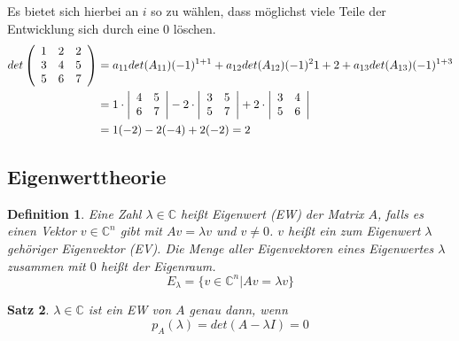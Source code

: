 \documentclass[12pt,a4paper]{report}%
\newtheorem{satz}{Satz}[section]
\newtheorem{definition}[satz]{Definition}
\numberwithin{equation}{section}
\newcommand{\C}{\mathbb{C}}
\def\mdxd#1#2#3{\left(\begin{array}{c c c} #1 \\ #2 \\ #3 \end{array}\right)}
\numberwithin{equation}{subsection}
\begin{document}
  Es bietet sich hierbei an $i$ so zu wählen, dass möglichst viele Teile der Entwicklung sich durch eine $0$ löschen.
  \begin{align*}
    det \mdxd{1 & 2 & 2}{3 & 4 & 5}{5 & 6 & 7} &= a_{11} det(A_{11}) (-1)^{1+1} + a_{12} det(A_{12})(-1)^2{1+2} + a_{13}det(A_{13})(-1)^{1+3} \\
    &= 1\cdot \left|\begin{array}{c c} 4 & 5 \\ 6 & 7 \\ \end{array}\right|
      -2 \cdot \left|\begin{array}{c c} 3 & 5 \\ 5 & 7 \\ \end{array}\right|
      + 2 \cdot \left|\begin{array}{c c} 3 & 4 \\ 5 & 6 \\ \end{array}\right|\\
    &= 1(-2)-2(-4)+2(-2) = 2
  \end{align*}
  
  \subsection{Eigenwerttheorie}
  \begin{definition}
    Eine Zahl $\lambda \in \C$ heißt Eigenwert (EW) der Matrix $A$, falls es einen Vektor $v \in \C^n$ gibt mit $Av = \lambda v$ und $v \neq 0$. $v$ heißt ein zum Eigenwert $\lambda$ gehöriger Eigenvektor (EV). Die Menge aller Eigenvektoren eines Eigenwertes $\lambda$ zusammen mit $0$ heißt der Eigenraum.
    \begin{equation}
      E_{\lambda} = \lbrace v \in \C^n | Av = \lambda v \rbrace
    \end{equation}      
  \end{definition}
  \begin{satz}
    $\lambda \in \C$ ist ein EW von $A$ genau dann, wenn
    \begin{equation}
      p_A(\lambda) = det(A-\lambda I) = 0 \label{eq:ew_charpol}
    \end{equation}
  \end{satz}
  
\end{document}
